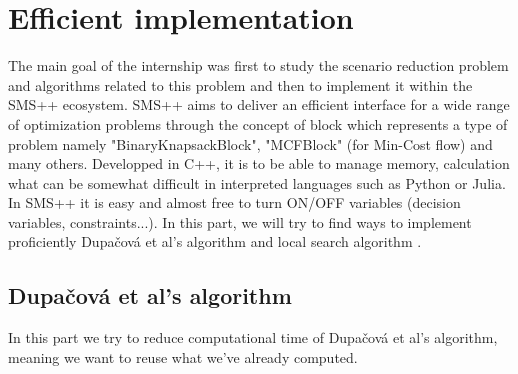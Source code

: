 \documentclass{amsart}
\begin{document}
\section{Efficient implementation}
The main goal of the internship was first to study the scenario reduction problem and algorithms related to this problem and then to implement it within the SMS++ ecosystem. SMS++ aims to deliver an efficient interface for a wide range of optimization problems through the concept of block which represents a type of problem namely "BinaryKnapsackBlock", "MCFBlock" (for Min-Cost flow) and many others. Developped in C++, it is to be able to manage memory, calculation what can be somewhat difficult in interpreted languages such as Python or Julia. In SMS++ it is easy and almost free to turn ON/OFF variables (decision variables, constraints...). In this part, we will try to find ways to implement proficiently Dupačová et al's algorithm  and local search algorithm .

\subsection{Dupačová et al's algorithm}
In this part we try to reduce computational time of Dupačová et al's algorithm, meaning we want to reuse what we've already computed. 
\newline
\end{document}
